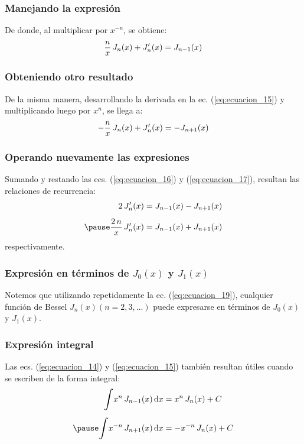 \documentclass[12pt]{beamer}
\begin{document}
\begin{frame}
\frametitle{Manejando la expresión}
De donde, al multiplicar por $x^{-n}$, se obtiene:
\begin{align}
\dfrac{n}{x} \, J_{n}(x) + {J}^{\prime}_{n}(x) = J_{n-1}(x)
\label{eq:ecuacion_16}
\end{align}
\end{frame}
\begin{frame}
\frametitle{Obteniendo otro resultado}
De la misma manera, desarrollando la derivada en la ec. (\ref{eq:ecuacion_15}) y multiplicando luego por $x^{n}$, se llega a:
\pause
\begin{align}
-\dfrac{n}{x} \, J_{n}(x) + {J}^{\prime}_{n}(x) = - J_{n+1}(x)
\label{eq:ecuacion_17}    
\end{align}
\end{frame}
\begin{frame}
\frametitle{Operando nuevamente las expresiones}
Sumando y restando las ecs. (\ref{eq:ecuacion_16}) y (\ref{eq:ecuacion_17}), resultan las relaciones de recurrencia:
\begin{eqnarray}
\begin{aligned}
2 \, \pderivada{J}_{n}(x) &= J_{n-1} (x) - J_{n+1}(x) \label{eq:ecuacion_18} \\[0.5em] \pause
\dfrac{2 \, n}{x} \, \pderivada{J}_{n}(x) &= J_{n-1} (x) + J_{n+1}(x) \label{eq:ecuacion_19}
\end{aligned}
\end{eqnarray}
respectivamente.
\end{frame}
\begin{frame}
\frametitle{Expresión en términos de $J_{0}(x)$ y $J_{1}(x)$}
Notemos que utilizando repetidamente la ec. (\ref{eq:ecuacion_19}), cualquier función de Bessel $J_{n}(x) (n = 2, 3, \ldots)$ puede expresarse en términos de $J_{0}(x)$ y $J_{1}(x)$.
\end{frame}\begin{frame}
\frametitle{Expresión integral}
Las ecs. (\ref{eq:ecuacion_14}) y (\ref{eq:ecuacion_15}) también resultan útiles cuando se escriben de la forma integral:
\pause
\begin{eqnarray}
\begin{aligned}
\scaleint{6ex} x^{n} \, J_{n-1} (x) \dd{x} &= x^{n} \, J_{n}(x) + C \label{eq:ecuacion_20} \\[0.5em] \pause
\scaleint{6ex} x^{-n} \, J_{n+1} (x) \dd{x} &= - x^{-n} \, J_{n}(x) + C \label{eq:ecuacion_21}
\end{aligned}
\end{eqnarray}
\end{frame}
\end{document}
